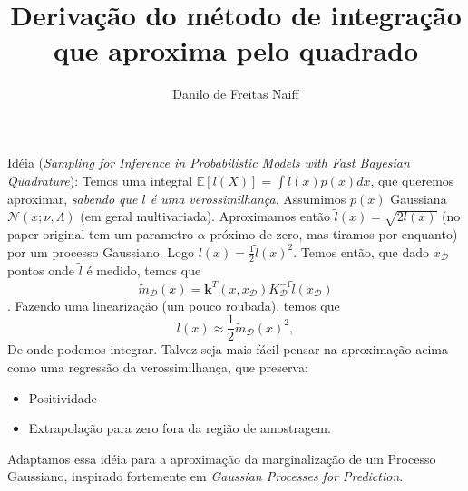 \documentclass[12pt]{article}
\begin{document}
 
 \title{Derivação do método de integração que aproxima pelo quadrado}
 \author{Danilo de Freitas Naiff}
 \date{}
 \maketitle
 Idéia (\textit{Sampling for Inference in Probabilistic Models with Fast Bayesian Quadrature}):
 Temos uma integral $\mathbb{E}[ l(X)] = \int l(x) p(x) dx$, que queremos aproximar, 
 \textit{sabendo que $l$ é uma verossimilhança}. Assumimos $p(x)$ Gaussiana  
 $\mathcal{N}(x;\nu,\Lambda)$ (em geral multivariada). Aproximamos então $\tilde{l}(x) = \sqrt{2 l(x)}$ 
 (no paper original tem um parametro $\alpha$ próximo de zero, mas tiramos por enquanto) por um processo Gaussiano. Logo $l(x) = \frac{1}{2} \tilde{l}(x)^2$. Temos então, que dado $x_\mathcal{D}$ pontos 
 onde $\tilde{l}$ é medido, temos que
 \begin{equation}
 \tilde{m}_\mathcal{D}(x) = \mathbf{k}^T (x,x_\mathcal{D}) K_\mathcal{D}^{-1} \tilde{l}(x_\mathcal{D})
 \end{equation}. 
 Fazendo uma linearização (um pouco roubada), temos que
 \begin{equation}
 l(x) \approx \frac{1}{2} \tilde{m}_\mathcal{D}(x)^2, 
 \end{equation}
 De onde podemos integrar. Talvez seja mais fácil pensar na aproximação acima como uma 
 regressão da verossimilhança, que preserva:
 \begin{itemize}
 	\item Positividade
 	\item Extrapolação para zero fora da região de amostragem.
 \end{itemize}
 Adaptamos essa idéia para a aproximação da marginalização de um Processo Gaussiano, inspirado 
 fortemente em \textit{Gaussian Processes for Prediction}.
 
\end{document}
